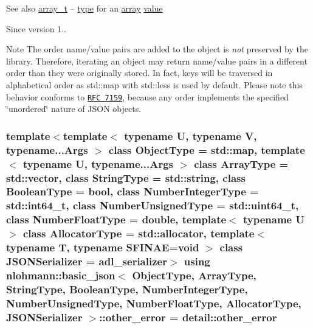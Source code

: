 \begin{DoxySeeAlso}{See also}
\hyperlink{classnlohmann_1_1basic__json_a4c409f1b6d9caf3412c78af9a5883fed}{array\+\_\+t} -- \hyperlink{classnlohmann_1_1basic__json_a2b2d781d7f2a4ee41bc0016e931cadf7}{type} for an \hyperlink{classnlohmann_1_1basic__json_a8a7d537fc297bbc5b845f92fe0445e3b}{array} \hyperlink{classnlohmann_1_1basic__json_a404017aa52714a0a4bc79d5af7e4ad2b}{value}
\end{DoxySeeAlso}
\begin{DoxySince}{Since}
version 1..
\end{DoxySince}
\begin{DoxyNote}{Note}
The order name/value pairs are added to the object is {\itshape not} preserved by the library. Therefore, iterating an object may return name/value pairs in a different order than they were originally stored. In fact, keys will be traversed in alphabetical order as {\ttfamily std\+::map} with {\ttfamily std\+::less} is used by default. Please note this behavior conforms to \href{http://rfc7159.net/rfc7159}{\tt R\+FC 7159}, because any order implements the specified \char`\"{}unordered\char`\"{} nature of J\+S\+ON objects. 
\end{DoxyNote}
\subsubsection[{\texorpdfstring{other\+\_\+error}{other_error}}]{\setlength{\rightskip}{0pt plus 5cm}template$<$template$<$ typename U, typename V, typename...\+Args $>$ class Object\+Type = std\+::map, template$<$ typename U, typename...\+Args $>$ class Array\+Type = std\+::vector, class String\+Type  = std\+::string, class Boolean\+Type  = bool, class Number\+Integer\+Type  = std\+::int64\+\_\+t, class Number\+Unsigned\+Type  = std\+::uint64\+\_\+t, class Number\+Float\+Type  = double, template$<$ typename U $>$ class Allocator\+Type = std\+::allocator, template$<$ typename T, typename S\+F\+I\+N\+A\+E=void $>$ class J\+S\+O\+N\+Serializer = adl\+\_\+serializer$>$ using {\bf nlohmann\+::basic\+\_\+json}$<$ Object\+Type, Array\+Type, String\+Type, Boolean\+Type, Number\+Integer\+Type, Number\+Unsigned\+Type, Number\+Float\+Type, Allocator\+Type, J\+S\+O\+N\+Serializer $>$\+::{\bf other\+\_\+error} =  {\bf detail\+::other\+\_\+error}}\hypertarget{classnlohmann_1_1basic__json_a3333a5a8714912adda33a35b369f7b3d}{}\label{classnlohmann_1_1basic__json_a3333a5a8714912adda33a35b369f7b3d}


